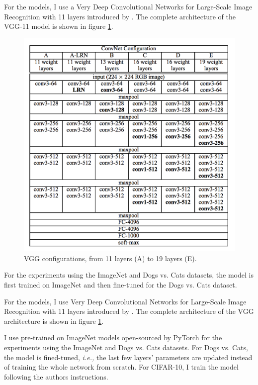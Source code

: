 For the models, I use a Very Deep Convolutional Networks for Large-Scale Image
Recognition with 11 layers introduced by \cite{simonyan_very_2015-2}. The
complete architecture of the VGG-11 model is shown in figure \ref{fig:vgg11}.
\begin{figure}[ht]
    \includegraphics[clip,width=\columnwidth]{Figures/experiments/vgg_architecture.png}%
    \caption{VGG configurations, from 11 layers (A) to 19 layers (E).}
    \label{fig:vgg11}
\end{figure}

For the experiments using the ImageNet and Dogs vs. Cats datasets, the model is
first trained on ImageNet and then fine-tuned for the Dogs vs. Cats dataset.

For the models, I use Very Deep Convolutional Networks for Large-Scale Image
Recognition with 11 layers introduced by \cite{simonyan_very_2015-2}. The
complete architecture of the VGG architecture is shown in figure
\ref{fig:vgg11}.

I use pre-trained on ImageNet models open-sourced by PyTorch for the experiments
using the ImageNet and Dogs vs. Cats datasets. For Dogs vs. Cats, the model is
fined-tuned, \emph{i.e.,} the last few layers' parameters are updated instead of
training the whole network from scratch. For CIFAR-10, I train the model
following the authors instructions.

